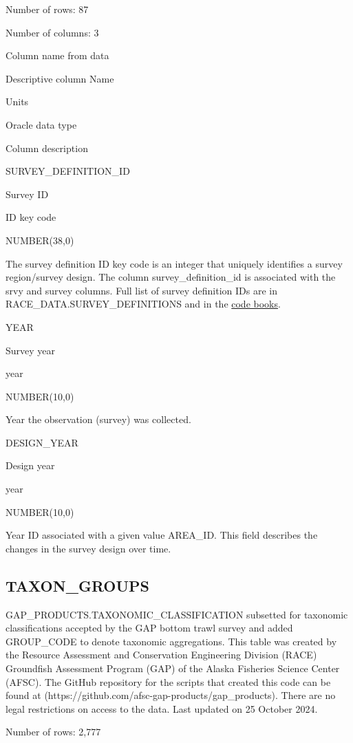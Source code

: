\documentclass[
  letterpaper,
  oneside,
  open=any]{scrbook}
\begin{document}
Number of rows: 87

Number of columns: 3

Column name from data

Descriptive column Name

Units

Oracle data type

Column description

SURVEY\_DEFINITION\_ID

Survey ID

ID key code

NUMBER(38,0)

The survey definition ID key code is an integer that uniquely identifies
a survey region/survey design. The column survey\_definition\_id is
associated with the srvy and survey columns. Full list of survey
definition IDs are in RACE\_DATA.SURVEY\_DEFINITIONS and in the
\href{https://www.fisheries.noaa.gov/resource/document/groundfish-survey-species-code-manual-and-data-codes-manual}{code
books}.

YEAR

Survey year

year

NUMBER(10,0)

Year the observation (survey) was collected.

DESIGN\_YEAR

Design year

year

NUMBER(10,0)

Year ID associated with a given value AREA\_ID. This field describes the
changes in the survey design over time.

\subsection{TAXON\_GROUPS}\label{taxon_groups}

GAP\_PRODUCTS.TAXONOMIC\_CLASSIFICATION subsetted for taxonomic
classifications accepted by the GAP bottom trawl survey and added
GROUP\_CODE to denote taxonomic aggregations. This table was created by
the Resource Assessment and Conservation Engineering Division (RACE)
Groundfish Assessment Program (GAP) of the Alaska Fisheries Science
Center (AFSC). The GitHub repository for the scripts that created this
code can be found at
(https://github.com/afsc-gap-products/gap\_products). There are no legal
restrictions on access to the data. Last updated on 25 October 2024.

Number of rows: 2,777
\end{document}
